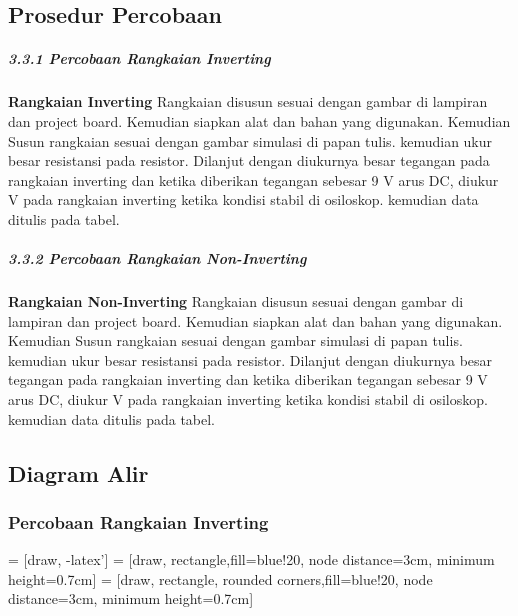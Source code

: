 \documentclass[12pt,a4paper]{article}
\begin{document}
  
    
\subsection{Prosedur Percobaan}
\subparagraph{3.3.1 Percobaan Rangkaian Inverting }
\subparagraph{ }
\textbf{Rangkaian Inverting} Rangkaian disusun sesuai dengan gambar di lampiran dan project board. Kemudian siapkan alat dan bahan yang digunakan. Kemudian Susun rangkaian sesuai dengan gambar simulasi di papan tulis. kemudian ukur besar resistansi pada resistor. Dilanjut dengan diukurnya besar tegangan pada rangkaian inverting dan ketika diberikan tegangan sebesar 9 V arus DC, diukur  V pada rangkaian inverting ketika kondisi stabil di osiloskop. kemudian data ditulis pada tabel.
	
\subparagraph{3.3.2 Percobaan Rangkaian Non-Inverting }
\subparagraph{ }
	\textbf{Rangkaian Non-Inverting} Rangkaian disusun sesuai dengan gambar di lampiran dan project board. Kemudian siapkan alat dan bahan yang digunakan. Kemudian Susun rangkaian sesuai dengan gambar simulasi di papan tulis. kemudian ukur besar resistansi pada resistor. Dilanjut dengan diukurnya besar tegangan pada rangkaian inverting dan ketika diberikan tegangan sebesar 9 V arus DC, diukur  V pada rangkaian inverting ketika kondisi stabil di osiloskop. kemudian data ditulis pada tabel.

\subsection{Diagram Alir}
\subsubsection{Percobaan Rangkaian Inverting }
 = [draw, -latex']
 = [draw, rectangle,fill=blue!20, node distance=3cm,
    minimum height=0.7cm]
 = [draw, rectangle, rounded corners,fill=blue!20, node distance=3cm,
    minimum height=0.7cm]
\end{document}
